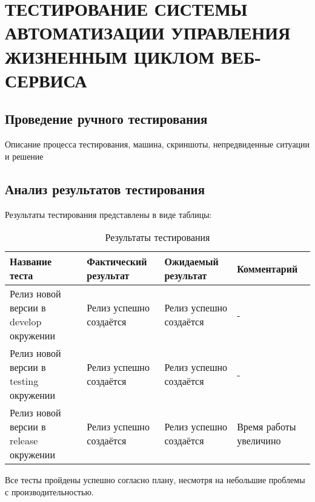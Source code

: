 \chapter{ТЕСТИРОВАНИЕ СИСТЕМЫ АВТОМАТИЗАЦИИ УПРАВЛЕНИЯ ЖИЗНЕННЫМ ЦИКЛОМ ВЕБ-СЕРВИСА}
\label{cha:research}

\section{Проведение ручного тестирования}

Описание процесса тестирования, машина, скриншоты, непредвиденные ситуации и решение

\section{Анализ результатов тестирования}

Результаты тестирования представлены в виде таблицы:

\begin{center}
    \begin{longtable}{|p{}|p{}|p{}|p{}|}
        \caption{Результаты тестирования}
        \label{tab:testing-res}
        \hline
        Название теста & Фактический результат & Ожидаемый результат & Комментарий \\
        \hline
        Релиз новой версии в develop окружении & Релиз успешно создаётся & Релиз успешно создаётся & - \\
        \hline
        Релиз новой версии в testing окружении & Релиз успешно создаётся & Релиз успешно создаётся & - \\
        \hline
        Релиз новой версии в release окружении & Релиз успешно создаётся & Релиз успешно создаётся & Время работы увеличино \\
        \hline
    \end{longtable}
\end{center}

Все тесты пройдены успешно согласно плану, несмотря на небольшие проблемы с производительностью.


